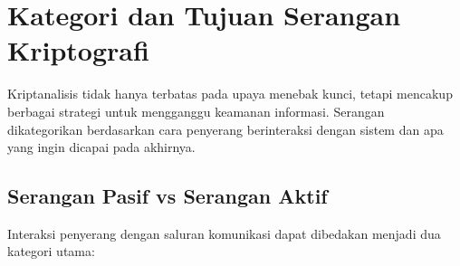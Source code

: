 \section{Kategori dan Tujuan Serangan Kriptografi}

Kriptanalisis tidak hanya terbatas pada upaya menebak kunci, tetapi mencakup berbagai strategi untuk mengganggu keamanan informasi. Serangan dikategorikan berdasarkan cara penyerang berinteraksi dengan sistem dan apa yang ingin dicapai pada akhirnya.

\subsection{Serangan Pasif vs Serangan Aktif}

Interaksi penyerang dengan saluran komunikasi dapat dibedakan menjadi dua kategori utama:

